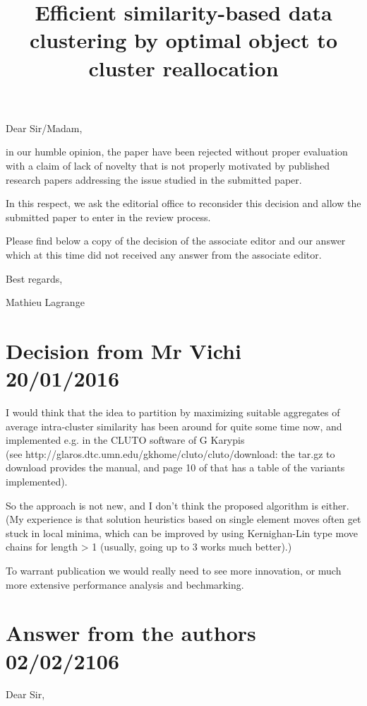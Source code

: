 \documentclass[a4paper,fleqn]{article}
\title{Efficient similarity-based data clustering by optimal object to cluster reallocation}
\begin{document}
 
\maketitle


Dear Sir/Madam,

in our humble opinion, the paper have been rejected without proper evaluation with a claim of lack of novelty that is not properly motivated by published research papers addressing the issue studied in the submitted paper.

In this respect, we ask the editorial office to reconsider this decision and allow the submitted paper to enter in the review process.

Please find below a copy of the decision of the associate editor and our answer which at this time did not received any answer from the associate editor.

Best regards,

Mathieu Lagrange



\section{Decision from Mr Vichi 20/01/2016}

I would think that the idea to partition by maximizing suitable
aggregates of average intra-cluster similarity has been around for quite
some time now, and implemented e.g. in the CLUTO software of G Karypis \\
(see http://glaros.dtc.umn.edu/gkhome/cluto/cluto/download: the tar.gz
to download provides the manual, and page 10 of that has a table of the
variants implemented).

So the approach is not new, and I don't think the proposed algorithm is
either.  (My experience is that solution heuristics based on single
element moves often get stuck in local minima, which can be improved by
using Kernighan-Lin type move chains for length > 1 (usually, going up
to 3 works much better).)

To warrant publication we would really need to see more innovation, or
much more extensive performance analysis and bechmarking.


\section{Answer from the authors 02/02/2106}

Dear Sir,
\end{document}
